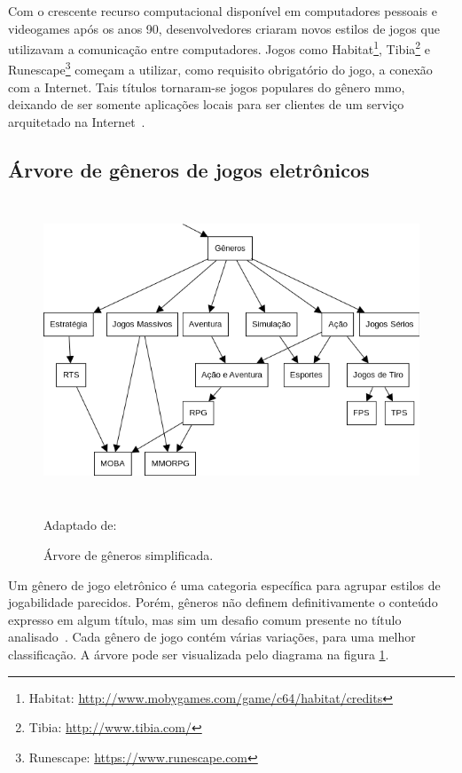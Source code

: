 Com o crescente recurso computacional disponível em computadores pessoais e videogames após os anos 90, desenvolvedores criaram novos estilos de jogos que utilizavam a comunicação entre computadores.
%
Jogos como Habitat\footnote{Habitat: \url{http://www.mobygames.com/game/c64/habitat/credits}}, Tibia\footnote{Tibia: \url{http://www.tibia.com/}} e Runescape\footnote{Runescape: \url{https://www.runescape.com}} começam a utilizar, como requisito obrigatório do jogo, a conexão com a Internet.
%
Tais títulos tornaram-se jogos populares do gênero \ac{mmo}, deixando de ser somente aplicações locais para ser clientes de um serviço arquitetado na Internet~\cite{adams_1208533, Adams2014Jan}.



\subsection{Árvore de gêneros de jogos eletrônicos}



\begin{figure}[htb!]
\caption{Árvore de gêneros simplificada.}
\label{fig:generos}
\includegraphics[height=9cm]{img/cap2/generos.png}
\centering

Adaptado de:~\cite{adams_1208533}
\end{figure}



Um gênero de jogo eletrônico é uma categoria específica para agrupar estilos de jogabilidade parecidos.
%
Porém, gêneros não definem definitivamente o conteúdo expresso em algum título, mas sim um desafio comum presente no título analisado~\cite{adams_1208533, video_game_technologies}.
%
Cada gênero de jogo contém várias variações, para uma melhor classificação.
%
A árvore pode ser visualizada pelo diagrama na figura \ref{fig:generos}.



